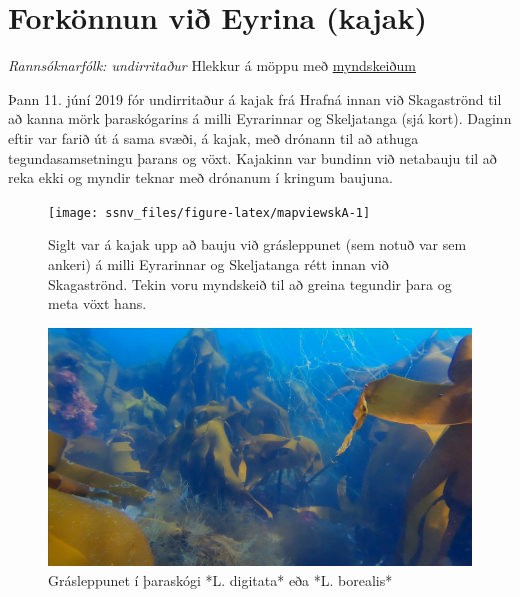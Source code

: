 \documentclass[icelandic,]{book}
\begin{document}
\hypertarget{forkonnun-vi-eyrina-kajak}{%
\chapter*{Forkönnun við Eyrina (kajak)}\label{forkonnun-vi-eyrina-kajak}}

\emph{Rannsóknarfólk: undirritaður} Hlekkur á möppu með \href{https://www.dropbox.com/sh/oqnsnftqeks0mie/AAAI7vYZcEy5o78c5YaTVXn0a?dl=0}{myndskeiðum}

Þann 11. júní 2019 fór undirritaður á kajak frá Hrafná innan við Skagaströnd til að kanna mörk þaraskógarins á milli Eyrarinnar og Skeljatanga (sjá kort). Daginn eftir var farið út á sama svæði, á kajak, með drónann til að athuga tegundasamsetningu þarans og vöxt. Kajakinn var bundinn við netabauju til að reka ekki og myndir teknar með drónanum í kringum baujuna.

\begin{figure}

{\centering \texttt{[image: ssnv\_files/figure-latex/mapviewskA-1]} 

}

\caption{Siglt var á kajak upp að bauju við grásleppunet (sem notuð var sem ankeri) á milli Eyrarinnar og Skeljatanga rétt innan við Skagaströnd. Tekin voru myndskeið til að greina tegundir þara og meta vöxt hans.}\label{fig:mapviewskA}
\end{figure}

\begin{figure}

{\centering \includegraphics[width=1\linewidth]{skjol/skogar/sk1/stodvar/st1/sk1-st1} 

}

\caption{Grásleppunet í þaraskógi *L. digitata* eða *L. borealis* }\label{fig:mynd-sk-eitt-stod-eitt}
\end{figure}
\end{document}
